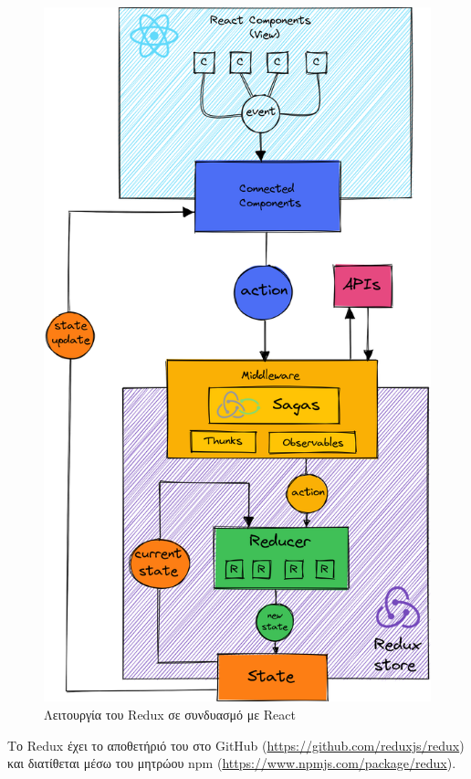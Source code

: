 \begin{figure}[H]
	\centering
	\includegraphics[width=.75\textwidth]{assets/figures/chapter-4/4.2.react-redux}
	\caption{Λειτουργία του Redux σε συνδυασμό με React}
\end{figure}

Το Redux έχει το αποθετήριό του στο GitHub (\url{https://github.com/reduxjs/redux}) και διατίθεται μέσω του μητρώου npm (\url{https://www.npmjs.com/package/redux}).
